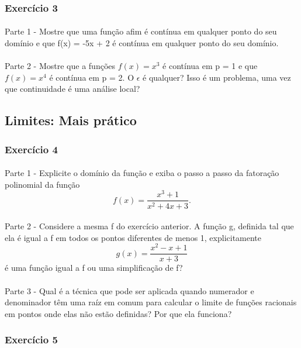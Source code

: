 \documentclass{article}
\begin{document}
\subsubsection{Exerc\'icio 3} 
\paragraph{} Parte 1 - Mostre que uma fun\c c\~ao afim \'e cont\'inua em qualquer ponto do seu dom\'inio e que f(x) = -5x + 2 \'e cont\'inua em qualquer ponto do seu dom\'inio.
\paragraph{} Parte 2 - Mostre que a fun\c c\~oes $f(x) = x^3$ \'e cont\'inua em p = 1 e que $f(x) = x^4$ \'e cont\'inua em p = 2. O $\epsilon$ \'e qualquer? Isso \'e um problema, uma vez que continuidade \'e uma an\'alise local?
\subsection{Limites: Mais pr\'atico} 
\subsubsection{Exerc\'icio 4} 
\paragraph{} Parte 1 - Explicite o dom\'inio da fun\c c\~ao e exiba o passo a passo da fatora\c c\~ao polinomial da fun\c c\~ao
$$
f(x) = \frac{x^3 + 1}{x^2  + 4x + 3}.
$$
\paragraph{} Parte 2 - Considere a mesma f do exerc\'icio anterior. A fun\c c\~ao g, definida tal que ela \'e igual a f em todos os pontos diferentes de menos 1, explicitamente
$$
g(x) = \frac{x^2 - x + 1}{x + 3}
$$
\'e uma fun\c c\~ao igual a f ou uma simplifica\c c\~ao de f?
\paragraph{} Parte 3 - Qual \'e a t\'ecnica que pode ser aplicada quando numerador e denominador t\^em uma ra\'iz em comum para calcular o limite de fun\c c\~oes racionais em pontos onde elas n\~ao est\~ao definidas? Por que ela funciona?
\subsubsection{Exerc\'icio 5}
\end{document}

